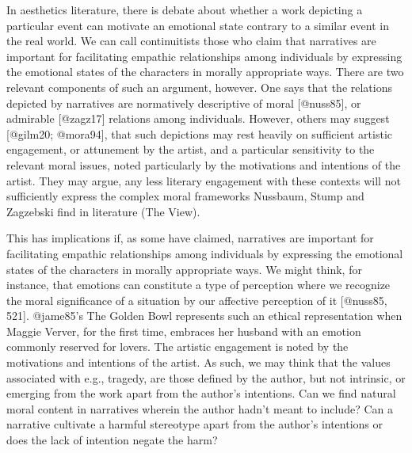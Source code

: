 \documentclass[
  letterpaper,
  DIV=11,
  numbers=noendperiod]{scrartcl}
\theoremstyle{remark}
\begin{document}
In aesthetics literature, there is debate about whether a work depicting
a particular event can motivate an emotional state contrary to a similar
event in the real world. We can call continuitists those who claim that
narratives are important for facilitating empathic relationships among
individuals by expressing the emotional states of the characters in
morally appropriate ways. There are two relevant components of such an
argument, however. One says that the relations depicted by narratives
are normatively descriptive of moral {[}@nuss85{]}, or admirable
{[}@zagz17{]} relations among individuals. However, others may suggest
{[}@gilm20; @mora94{]}, that such depictions may rest heavily on
sufficient artistic engagement, or attunement by the artist, and a
particular sensitivity to the relevant moral issues, noted particularly
by the motivations and intentions of the artist. They may argue, any
less literary engagement with these contexts will not sufficiently
express the complex moral frameworks Nussbaum, Stump and Zagzebski find
in literature (The View).

This has implications if, as some have claimed, narratives are important
for facilitating empathic relationships among individuals by expressing
the emotional states of the characters in morally appropriate ways. We
might think, for instance, that emotions can constitute a type of
perception where we recognize the moral significance of a situation by
our affective perception of it {[}@nuss85, 521{]}. @jame85's The Golden
Bowl represents such an ethical representation when Maggie Verver, for
the first time, embraces her husband with an emotion commonly reserved
for lovers. The artistic engagement is noted by the motivations and
intentions of the artist. As such, we may think that the values
associated with e.g., tragedy, are those defined by the author, but not
intrinsic, or emerging from the work apart from the author's intentions.
Can we find natural moral content in narratives wherein the author
hadn't meant to include? Can a narrative cultivate a harmful stereotype
apart from the author's intentions or does the lack of intention negate
the harm?
\end{document}

